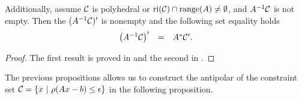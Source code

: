 \begin{enumerate}
\begin{prop}
Additionally, assume ${\mathcal C}$ is polyhedral or $\textnormal{ri}({\mathcal C}) \cap \textnormal{range}(A) \neq \emptyset$, and $A^{-1}{\mathcal C}$ is not empty.  Then the $( A^{-1} {\mathcal C})'$ is nonempty and the following set equality holds
\begin{equation}		\label{Eqn:antipolar_set_equalities_2}
\begin{array}{rll}
\left( A^{-1} {\mathcal C} \right)' & = &  A^* {\mathcal C}' .
\end{array}
\end{equation}
\end{prop}
\begin{proof}
The first result is proved in \cite[Proposition 3.3]{DBLP:journals/siamjo/FriedlanderMP14} and the second in \cite[Proposition 3.4, 3.5]{DBLP:journals/siamjo/FriedlanderMP14}.
\end{proof}


The previous propositions allows us to construct the antipolar of the constraint set ${\mathcal C} = \{ x \ | \ \rho(Ax-b) \leq \epsilon \}$ in the following proposition.



\end{enumerate}
